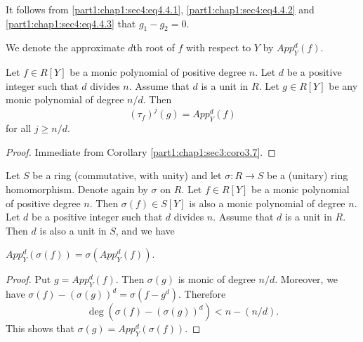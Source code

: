 It follows from \ref{part1:chap1:sec4:eq4.4.1}, \ref{part1:chap1:sec4:eq4.4.2} and \ref{part1:chap1:sec4:eq4.4.3} that $g_1-g_2=0$.

\begin{notn}\label{part1:chap1:sec4:notn4.5}
  We denote the approximate $d$th root of $f$ with respect to $Y$ by $App^d_Y (f)$.
\end{notn}

\begin{coro}\label{part1:chap1:sec4:coro4.6}
  Let $f\in R [Y]$ be a monic polynomial of positive degree $n$. Let $d$ be a positive integer such that $d$ divides $n$. Assume that $d$ is a unit in $R$. Let $g \in R [Y]$ be any monic polynomial of degree $n/d$. Then
$$
(\tau_f)^j (g) = App^d_{Y}(f)
$$
for all $j \geq n/d$.
\end{coro}

\begin{proof}
  Immediate from Corollary \ref{part1:chap1:sec3:coro3.7}.
\end{proof}

Let $S$ be a ring (commutative, with unity) and let $\sigma : R \to S$ be a (unitary) ring homomorphism. Denote again by $\sigma$ on $R$. Let $f \in R [Y]$ be a monic polynomial of positive degree $n$. Then $\sigma (f) \in S [Y]$ is also a monic polynomial of degree $n$. Let $d$ be a positive integer such that $d$ divides $n$. Assume that $d$ is a unit in $R$. Then $d$ is also a unit in $S$, and we have

\begin{prop}\label{part1:chap1:sec4:prop4.7}
  $App_Y^d (\sigma (f))= \sigma (App_Y^d(f))$.
\end{prop}

\begin{proof}
  Put $g = App_Y^d (f)$. Then $\sigma (g)$ is monic of degree $n/d$. Moreover, we have $\sigma(f) - (\sigma (g))^d= \sigma(f- g^d)$. Therefore
$$
\deg (\sigma (f)- (\sigma (g))^d) < n- (n/d).
$$
This shows that $\sigma (g) = App_Y^d (\sigma (f))$.
\end{proof}

